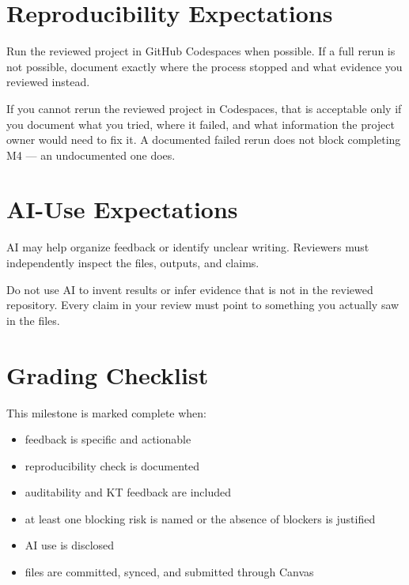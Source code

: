 \documentclass[
  letterpaper,
  DIV=11,
  numbers=noendperiod,
  oneside]{scrreprt}
\providecommand{\tightlist}{%
  \setlength{\itemsep}{0pt}\setlength{\parskip}{0pt}}
\begin{document}
\section{Reproducibility
Expectations}\label{reproducibility-expectations-6}

Run the reviewed project in GitHub Codespaces when possible. If a full
rerun is not possible, document exactly where the process stopped and
what evidence you reviewed instead.

If you cannot rerun the reviewed project in Codespaces, that is
acceptable only if you document what you tried, where it failed, and
what information the project owner would need to fix it. A documented
failed rerun does not block completing M4 --- an undocumented one does.

\section{AI-Use Expectations}\label{ai-use-expectations-15}

AI may help organize feedback or identify unclear writing. Reviewers
must independently inspect the files, outputs, and claims.

\begin{tcolorbox}[enhanced jigsaw, title=\textcolor{quarto-callout-warning-color}{\faExclamationTriangle}\hspace{0.5em}{Do not let AI invent evidence}, arc=.35mm, toptitle=1mm, colframe=quarto-callout-warning-color-frame, toprule=.15mm, leftrule=.75mm, bottomtitle=1mm, opacityback=0, bottomrule=.15mm, coltitle=black, breakable, opacitybacktitle=0.6, titlerule=0mm, colback=white, left=2mm, colbacktitle=quarto-callout-warning-color!10!white, rightrule=.15mm]

Do not use AI to invent results or infer evidence that is not in the
reviewed repository. Every claim in your review must point to something
you actually saw in the files.

\end{tcolorbox}

\section{Grading Checklist}\label{grading-checklist-14}

This milestone is marked complete when:

\begin{itemize}
\tightlist
\item
  feedback is specific and actionable
\item
  reproducibility check is documented
\item
  auditability and KT feedback are included
\item
  at least one blocking risk is named or the absence of blockers is
  justified
\item
  AI use is disclosed
\item
  files are committed, synced, and submitted through Canvas
\end{itemize}
\end{document}
